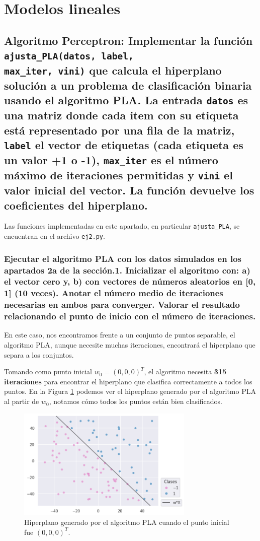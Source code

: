 \documentclass[a4paper, 20pt]{article}
\begin{document}
\section{Modelos lineales}

\subsection{\textbf{Algoritmo Perceptron}: Implementar la función \texttt{ajusta\_PLA(datos, label,\\ max\_iter, vini)} que calcula el hiperplano solución a un problema de clasificación binaria usando el algoritmo PLA. La entrada \texttt{datos} es una matriz donde cada item con su etiqueta está representado por una fila de la matriz, \texttt{label} el vector de etiquetas (cada etiqueta es un valor +1 o -1), \texttt{max\_iter} es el número máximo de iteraciones permitidas y \texttt{vini} el valor inicial del vector. La función devuelve los coeficientes del hiperplano.}

Las funciones implementadas en este apartado, en particular \texttt{ajusta\_PLA}, se encuentran en el archivo \texttt{ej2.py}.

\subsubsection{Ejecutar el algoritmo PLA con los datos simulados en los apartados 2a de la sección.1. Inicializar el algoritmo con: a) el vector cero y, b) con vectores de números aleatorios en [0, 1] (10 veces). Anotar el número medio de iteraciones necesarias en ambos para converger. Valorar el resultado relacionando el punto de inicio con el número de iteraciones.}

En este caso, nos encontramos frente a un conjunto de puntos separable, el algoritmo PLA, aunque necesite muchas iteraciones, encontrará el hiperplano que separa a los conjuntos.

Tomando como punto inicial $w_0 = (0,0,0)^T$, el algoritmo necesita \textbf{315 iteraciones} para encontrar el hiperplano que clasifica correctamente a todos los puntos. En la Figura \ref{fig:21} podemos ver el hiperplano generado por el algoritmo PLA al partir de $w_0$, notamos cómo todos los puntos están bien clasificados.

\begin{figure}[H]
    \centering
    \includegraphics[width=0.75\textwidth]{21}
    \caption{Hiperplano generado por el algoritmo PLA cuando el punto inicial fue $(0,0,0)^T$.}
    \label{fig:21}
\end{figure}
\end{document}
